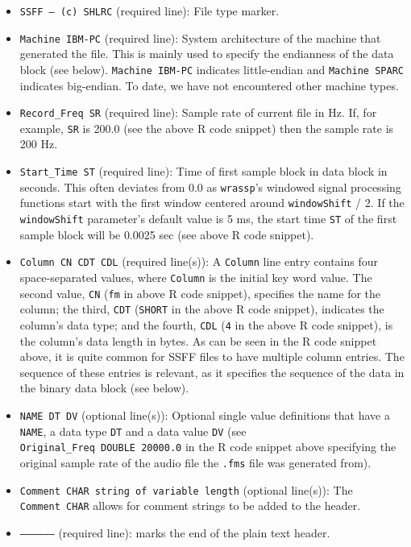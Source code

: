 \documentclass[]{book}
\begin{document}
\begin{itemize}
\item
  \texttt{SSFF\ –\ (c)\ SHLRC} (required line): File type marker.
\item
  \texttt{Machine\ IBM-PC} (required line): System architecture of the machine that generated the file. This is mainly used to specify the endianness of the data block (see below). \texttt{Machine\ IBM-PC} indicates little-endian and \texttt{Machine\ SPARC} indicates big-endian. To date, we have not encountered other machine types.
\item
  \texttt{Record\_Freq\ SR} (required line): Sample rate of current file in Hz. If, for example, \texttt{SR} is 200.0 (see the above R code snippet) then the sample rate is 200 Hz.
\item
  \texttt{Start\_Time\ ST} (required line): Time of first sample block in data block in seconds. This often deviates from 0.0 as \texttt{wrassp}'s windowed signal processing functions start with the first window centered around \texttt{windowShift} / 2. If the \texttt{windowShift} parameter's default value is 5 ms, the start time \texttt{ST} of the first sample block will be 0.0025 sec (see above R code snippet).
\item
  \texttt{Column\ CN\ CDT\ CDL} (required line(s)): A \texttt{Column} line entry contains four space-separated values, where \texttt{Column} is the initial key word value. The second value, \texttt{CN} (\texttt{fm} in above R code snippet), specifies the name for the column; the third, \texttt{CDT} (\texttt{SHORT} in the above R code snippet), indicates the column's data type; and the fourth, \texttt{CDL} (\texttt{4} in the above R code snippet), is the column's data length in bytes. As can be seen in the R code snippet above, it is quite common for SSFF files to have multiple column entries. The sequence of these entries is relevant, as it specifies the sequence of the data in the binary data block (see below).
\item
  \texttt{NAME\ DT\ DV} (optional line(s)): Optional single value definitions that have a \texttt{NAME}, a data type \texttt{DT} and a data value \texttt{DV} (see \texttt{Original\_Freq\ DOUBLE\ 20000.0} in the R code snippet above specifying the original sample rate of the audio file the \texttt{.fms} file was generated from).
\item
  \texttt{Comment\ CHAR\ string\ of\ variable\ length} (optional line(s)): The \texttt{Comment\ CHAR} allows for comment strings to be added to the header.
\item
  \texttt{—————–} (required line): marks the end of the plain text header.
\end{itemize}
\end{document}

